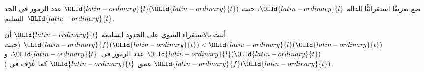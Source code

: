 \documentclass[../../../include/open-logic-section]{subfiles}
\begin{document}
\begin{prob}
  ضع تعريفًا استقرائيًّا للدالة ${\OLId{latin-ordinary}{l}}$، حيث ${\OLId{latin-ordinary}{l}}({\OLId{latin-ordinary}{t}})$ عدد الرموز في الحد
  السليم~${\OLId{latin-ordinary}{t}}$.
\end{prob}

\begin{prob}
  أثبت بالاستقراء البنيوي على الحدود السليمة ${\OLId{latin-ordinary}{t}}$ أن ${\OLId{latin-ordinary}{f}}({\OLId{latin-ordinary}{t}}) < {\OLId{latin-ordinary}{l}}({\OLId{latin-ordinary}{t}})$ (حيث
  ${\OLId{latin-ordinary}{l}}({\OLId{latin-ordinary}{t}})$ عدد الرموز في~${\OLId{latin-ordinary}{t}}$، و${\OLId{latin-ordinary}{f}}({\OLId{latin-ordinary}{t}})$ عمق ${\OLId{latin-ordinary}{t}}$ كما عُرّف في
  ).
\end{prob}
\end{document}

